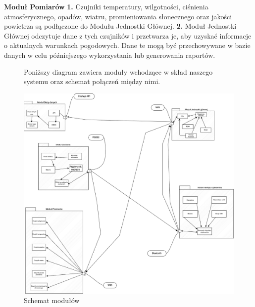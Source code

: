 \documentclass{article}
\begin{document}
\begin{flushleft}
    \Large \textbf{Moduł Pomiarów} \newline \newline
    \large
    \textbf{1.} Czujniki temperatury, wilgotności, ciśnienia atmosferycznego, opadów, wiatru, promieniowania słonecznego oraz jakości powietrza są podłączone do Modułu Jednostki Głównej. \newline \newline
    \textbf{2.} Moduł Jednostki Głównej odczytuje dane z tych czujników i przetwarza je, aby uzyskać informacje o aktualnych warunkach pogodowych. Dane te mogą być przechowywane w bazie danych w celu późniejszego wykorzystania lub generowania raportów. \newline \newline
\end{flushleft}
\begin{figure}
    \centering
    \begin{minipage}{0.6\textwidth}
        \centering
        \large Poniższy diagram zawiera moduły wchodzące w skład naszego systemu oraz schemat połączeń między nimi.
    \end{minipage}
    \includegraphics[scale=0.5]{moduły.png}
    \caption{Schemat modułów}
    \label{etykieta}
\end{figure}
\end{document}
